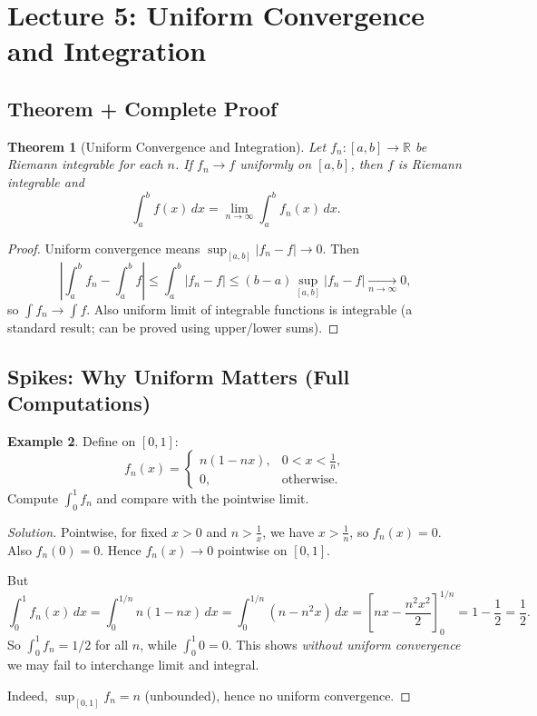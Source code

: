 \documentclass[12pt]{article}
\newtheorem{theorem}{Theorem}[section]
\theoremstyle{definition}
\newtheorem{example}[theorem]{Example}
\begin{document}
\section{Lecture 5: Uniform Convergence and Integration}

\subsection{Theorem + Complete Proof}

\begin{theorem}[Uniform Convergence and Integration]
Let $f_n:[a,b]\to\mathbb{R}$ be Riemann integrable for each $n$. If $f_n\to f$ uniformly on $[a,b]$,
then $f$ is Riemann integrable and
\[
\int_a^b f(x)\,dx = \lim_{n\to\infty}\int_a^b f_n(x)\,dx.
\]
\end{theorem}

\begin{proof}
Uniform convergence means $\sup_{[a,b]}|f_n-f|\to 0$.
Then
\[
\left|\int_a^b f_n - \int_a^b f\right|
\le \int_a^b |f_n-f|
\le (b-a)\sup_{[a,b]}|f_n-f|
\xrightarrow[n\to\infty]{}0,
\]
so $\int f_n\to \int f$.
Also uniform limit of integrable functions is integrable (a standard result; can be proved using upper/lower sums).
\end{proof}

\subsection{Spikes: Why Uniform Matters (Full Computations)}

\begin{example}
Define on $[0,1]$:
\[
f_n(x)=
\begin{cases}
n(1-nx), & 0<x<\frac{1}{n},\\
0, & \text{otherwise}.
\end{cases}
\]
Compute $\int_0^1 f_n$ and compare with the pointwise limit.
\end{example}

\begin{proof}[Solution]
Pointwise, for fixed $x>0$ and $n>\frac{1}{x}$, we have $x>\frac{1}{n}$, so $f_n(x)=0$.
Also $f_n(0)=0$. Hence $f_n(x)\to 0$ pointwise on $[0,1]$.

But
\[
\int_0^1 f_n(x)\,dx = \int_0^{1/n} n(1-nx)\,dx
= \int_0^{1/n} (n-n^2 x)\,dx
= \left[nx-\frac{n^2x^2}{2}\right]_{0}^{1/n}
=1-\frac12=\frac12.
\]
So $\int_0^1 f_n = 1/2$ for all $n$, while $\int_0^1 0 = 0$.
This shows \emph{without uniform convergence} we may fail to interchange limit and integral.

Indeed, $\sup_{[0,1]} f_n = n$ (unbounded), hence no uniform convergence.
\end{proof}
\end{document}
